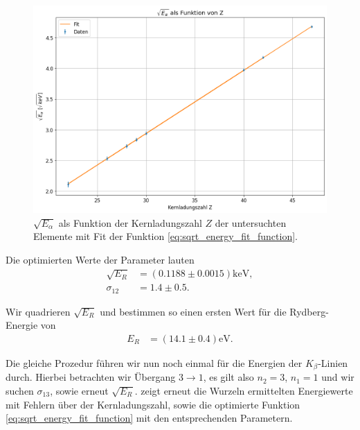 \begin{figure}[H]
  \centering
  \includegraphics[width=\textwidth]{files/K_alpha_vs_Z_with_fit.png}
  \caption{$\sqrt{E_{\alpha}}$ als Funktion der Kernladungszahl $Z$ der untersuchten Elemente mit Fit der Funktion \eqref{eq:sqrt_energy_fit_function}.}
  \label{fig:K_alpha_vs_Z_with_fit}
\end{figure}

Die optimierten Werte der Parameter lauten
\begin{align}
  \sqrt{E_R} &= (0.1188 \pm 0.0015) \si{\kilo\electronvolt},\\[1em]
  \sigma_{12} &= 1.4 \pm 0.5.
\end{align}

Wir quadrieren $\sqrt{E_R}$ und bestimmen so einen ersten Wert für die Rydberg-Energie von
\begin{align}
  E_R &= (14.1 \pm 0.4) \si{\electronvolt}.
\end{align}

Die gleiche Prozedur führen wir nun noch einmal für die Energien der $K_{\beta}$-Linien durch. Hierbei betrachten wir Übergang $3\to1$, es gilt also $n_2 = 3$, $n_1 = 1$ und wir suchen $\sigma_{13}$, sowie erneut $\sqrt{E_R}$.  zeigt erneut die Wurzeln ermittelten Energiewerte mit Fehlern über der Kernladungszahl, sowie die optimierte Funktion \eqref{eq:sqrt_energy_fit_function} mit den entsprechenden Parametern.


